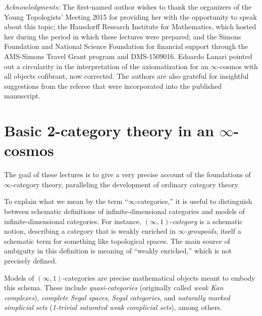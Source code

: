 \documentclass[12pt,reqno]{amsart}
\theoremstyle{plain}
\theoremstyle{definition}
\theoremstyle{remark}
\numberwithin{equation}{subsection}
\begin{document}
\maketitle
\newpage
\tableofcontents

\noindent
{\textit{Acknowledgments:} The first-named author wishes to thank the organizers of the Young Topologists' Meeting 2015 for providing her with the opportunity to speak about this topic; the Hausdorff Research Institute for Mathematics, which hosted her during the period in which these lectures were prepared; and the Simons Foundation and National Science Foundation for financial support through the AMS-Simons Travel Grant program and DMS-1509016. Edoardo Lanari pointed out a circularity in the interpretation of the axiomatization for an $\infty$-cosmos with all objects cofibrant, now corrected. The authors are also grateful for insightful suggestions from the referee that were incorporated into the published manuscript.}

\newpage

\pagestyle{plain}

\renewcommand\thesection{\bf Lecture~\arabic{section}}
\section{Basic 2-category theory in an \texorpdfstring{$\infty$}{infinity}-cosmos}\label{sec:2-cat}
\renewcommand\thesection{\arabic{section}}

The goal of these lectures is to give a very precise account of the foundations of $\infty$-category theory, paralleling the development of ordinary category theory.

To explain what we  mean by the term ``$\infty$-categories,'' it is useful to distinguish between schematic definitions of infinite-dimensional categories and models of infinite-dimensional categories. For instance, $(\infty,1)$-\emph{category} is a schematic notion, describing a category that is weakly enriched in $\infty$-\emph{groupoids}, itself a schematic term for something like topological spaces. The main source of ambiguity in this definition is meaning of ``weakly enriched,'' which is not precisely defined.

Models of $(\infty,1)$-categories are precise mathematical objects meant to embody this schema. These include \emph{quasi-categories} (originally called \emph{weak Kan complexes}), \emph{complete Segal spaces}, \emph{Segal categories}, and \emph{naturally marked simplicial sets} (\emph{1-trivial saturated weak complicial sets}), among others.
\end{document}
